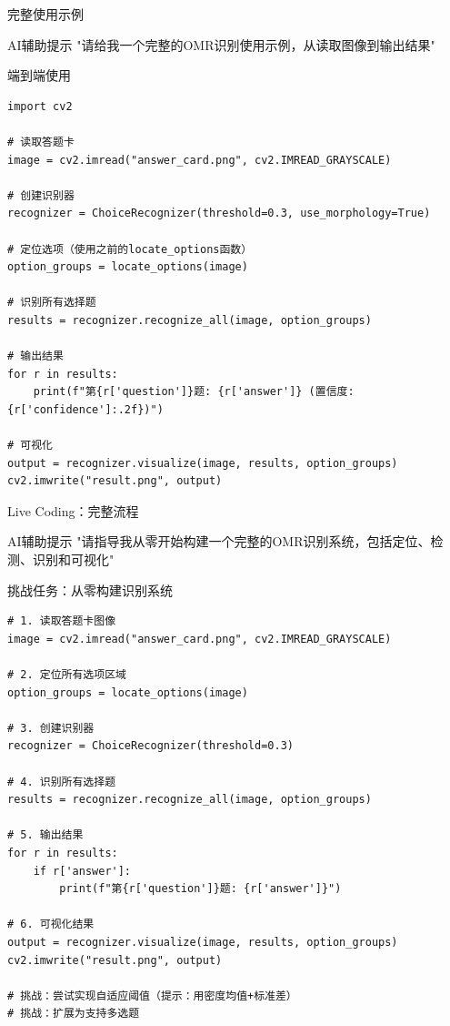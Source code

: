 \begin{frame}[fragile]{完整使用示例}
    \begin{block}{AI辅助提示}
        \aihint{} "请给我一个完整的OMR识别使用示例，从读取图像到输出结果"
    \end{block}

    \begin{block}{端到端使用}
    \begin{lstlisting}[basicstyle=\ttfamily\scriptsize]
import cv2

# 读取答题卡
image = cv2.imread("answer_card.png", cv2.IMREAD_GRAYSCALE)

# 创建识别器
recognizer = ChoiceRecognizer(threshold=0.3, use_morphology=True)

# 定位选项（使用之前的locate_options函数）
option_groups = locate_options(image)

# 识别所有选择题
results = recognizer.recognize_all(image, option_groups)

# 输出结果
for r in results:
    print(f"第{r['question']}题: {r['answer']} (置信度: {r['confidence']:.2f})")

# 可视化
output = recognizer.visualize(image, results, option_groups)
cv2.imwrite("result.png", output)
    \end{lstlisting}
    \end{block}
\end{frame}

\begin{frame}[fragile]{Live Coding：完整流程}
    \begin{block}{AI辅助提示}
        \aihint{} "请指导我从零开始构建一个完整的OMR识别系统，包括定位、检测、识别和可视化"
    \end{block}

    \begin{block}{挑战任务：从零构建识别系统}
    \begin{lstlisting}[basicstyle=\ttfamily\scriptsize]
# 1. 读取答题卡图像
image = cv2.imread("answer_card.png", cv2.IMREAD_GRAYSCALE)

# 2. 定位所有选项区域
option_groups = locate_options(image)

# 3. 创建识别器
recognizer = ChoiceRecognizer(threshold=0.3)

# 4. 识别所有选择题
results = recognizer.recognize_all(image, option_groups)

# 5. 输出结果
for r in results:
    if r['answer']:
        print(f"第{r['question']}题: {r['answer']}")

# 6. 可视化结果
output = recognizer.visualize(image, results, option_groups)
cv2.imwrite("result.png", output)

# 挑战：尝试实现自适应阈值（提示：用密度均值+标准差）
# 挑战：扩展为支持多选题
    \end{lstlisting}
    \end{block}
\end{frame}
